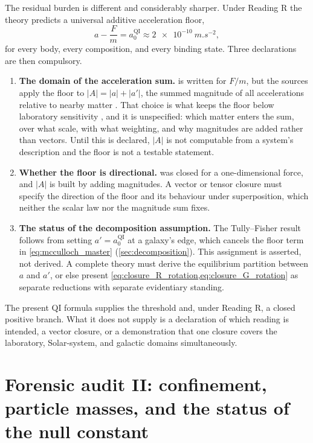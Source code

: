 \documentclass[11pt]{article}
\newcommand{\QI}{\mathrm{QI}}
\begin{document}
The residual burden is different and considerably sharper. Under Reading R the theory predicts a universal additive acceleration floor,
\begin{equation}
    a-\frac{F}{m}=a_{0}^{\QI}\approx\SI{2e-10}{m.s^{-2}},
    \label{eq:floor_prediction}
\end{equation}
for every body, every composition, and every binding state. Three declarations are then compulsory.
\begin{enumerate}[leftmargin=1.55em]
    \item \textbf{The domain of the acceleration sum.}  is written for \(F/m\), but the sources apply the floor to \(|A|=|a|+|a'|\), the summed magnitude of all accelerations relative to nearby matter \cite{McCulloch2012}. That choice is what keeps the floor below laboratory sensitivity \cite{McCulloch2011Tajmar}, and it is unspecified: which matter enters the sum, over what scale, with what weighting, and why magnitudes are added rather than vectors. Until this is declared, \(|A|\) is not computable from a system's description and the floor is not a testable statement.
    \item \textbf{Whether the floor is directional.}  was closed for a one-dimensional force, and \(|A|\) is built by adding magnitudes. A vector or tensor closure must specify the direction of the floor and its behaviour under superposition, which neither the scalar law nor the magnitude sum fixes.
    \item \textbf{The status of the decomposition assumption.} The Tully--Fisher result follows from setting \(a'=a_{0}^{\QI}\) at a galaxy's edge, which cancels the floor term in \cref{eq:mcculloch_master} (\cref{sec:decomposition}). This assignment is asserted, not derived. A complete theory must derive the equilibrium partition between \(a\) and \(a'\), or else present \cref{eq:closure_R_rotation,eq:closure_G_rotation} as separate reductions with separate evidentiary standing.
\end{enumerate}

The present QI formula supplies the threshold and, under Reading R, a closed positive branch. What it does not supply is a declaration of which reading is intended, a vector closure, or a demonstration that one closure covers the laboratory, Solar-system, and galactic domains simultaneously.

\section{Forensic audit II: confinement, particle masses, and the status of the null constant}
\label{sec:particle_mass}
\end{document}
